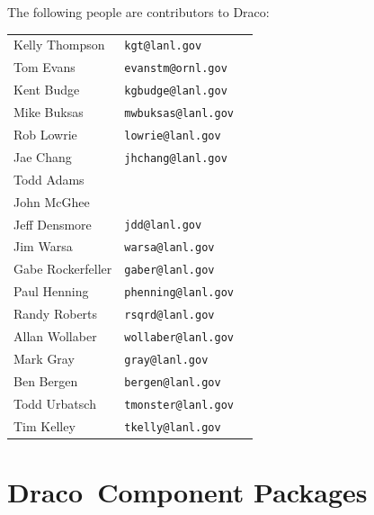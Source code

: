 \documentclass[note]{ResearchNote_pdf}
\newcommand{\draco}{Draco}
\begin{document}
The following people are contributors to \draco:
\begin{center}
  \small
  \begin{tabular}{lll}
    Kelly Thompson    & \texttt{kgt@lanl.gov}       \\
    Tom Evans         & \texttt{evanstm@ornl.gov}   \\
    Kent Budge        & \texttt{kgbudge@lanl.gov}   \\
    Mike Buksas       & \texttt{mwbuksas@lanl.gov}  \\
    Rob Lowrie        & \texttt{lowrie@lanl.gov}    \\
    Jae Chang         & \texttt{jhchang@lanl.gov}   \\
    Todd Adams        & \\
    John McGhee       & \\
    Jeff Densmore     & \texttt{jdd@lanl.gov}       \\
    Jim Warsa         & \texttt{warsa@lanl.gov}     \\
    Gabe Rockerfeller & \texttt{gaber@lanl.gov}     \\
    Paul Henning      & \texttt{phenning@lanl.gov}  \\
    Randy Roberts     & \texttt{rsqrd@lanl.gov}     \\
    Allan Wollaber    & \texttt{wollaber@lanl.gov}  \\
    Mark Gray         & \texttt{gray@lanl.gov}      \\
    Ben Bergen        & \texttt{bergen@lanl.gov}    \\
    Todd Urbatsch     & \texttt{tmonster@lanl.gov}  \\
    Tim Kelley        & \texttt{tkelly@lanl.gov}    \\
  \end{tabular}
\end{center}

\newpage
\section{\draco\ Component Packages}
\end{document}

